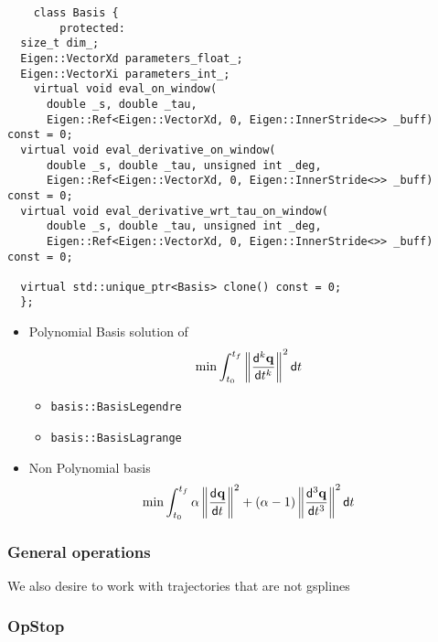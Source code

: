 \begin{frame}[fragile]
	\begin{lstlisting}
    class Basis {
        protected:
  size_t dim_;
  Eigen::VectorXd parameters_float_;
  Eigen::VectorXi parameters_int_;
    virtual void eval_on_window(
      double _s, double _tau,
      Eigen::Ref<Eigen::VectorXd, 0, Eigen::InnerStride<>> _buff) const = 0;
  virtual void eval_derivative_on_window(
      double _s, double _tau, unsigned int _deg,
      Eigen::Ref<Eigen::VectorXd, 0, Eigen::InnerStride<>> _buff) const = 0;
  virtual void eval_derivative_wrt_tau_on_window(
      double _s, double _tau, unsigned int _deg,
      Eigen::Ref<Eigen::VectorXd, 0, Eigen::InnerStride<>> _buff) const = 0;

  virtual std::unique_ptr<Basis> clone() const = 0;
  };
    \end{lstlisting}
\end{frame}
\begin{frame}[fragile]
	\begin{itemize}
		\item Polynomial Basis solution of
		      \begin{eqnarray}
			      \min \int_{t_0}^{t_f} \left\|\frac{\mathsf{d}^{k} \mathbf{q}}{\mathsf{d} t^{k}}\right\|^2 \mathsf{d} t
		      \end{eqnarray}
		      \begin{itemize}
			      \item  \Verb|basis::BasisLegendre|
			      \item  \Verb|basis::BasisLagrange|
		      \end{itemize}
		\item Non Polynomial basis
		      \begin{eqnarray}
			      \min \int_{t_0}^{t_f} \alpha \left\|\frac{\mathsf{d}^{} \mathbf{q}}{\mathsf{d} t^{}}\right\|^2  + (\alpha - 1 )\left\|\frac{\mathsf{d}^{3} \mathbf{q}}{\mathsf{d} t^{3}}\right\|^2 \mathsf{d} t
		      \end{eqnarray}
	\end{itemize}
\end{frame}

\begin{frame}[fragile]
	\frametitle{General operations}
	We also desire to work with trajectories that are not gsplines
\end{frame}

\begin{frame}[fragile]
	\frametitle{OpStop}
\end{frame}
